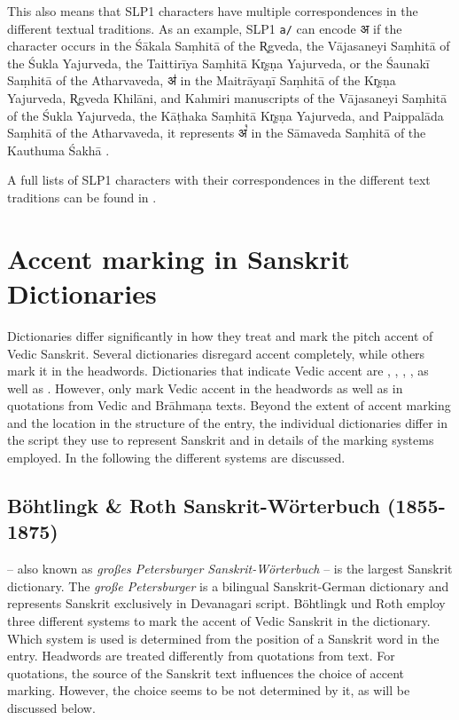 This also means that SLP1 characters have multiple correspondences in the different textual traditions. As an example, SLP1 \texttt{a/} \citep[p.~162; also SLP2 002]{ScharfHyman2011} can encode {\devfont अ} if the character occurs in the Śākala Saṃhitā of the R̥gveda, the Vājasaneyi Saṃhitā of the Śukla Yajurveda, the Taittirīya Saṃhitā Kr̥ṣṇa Yajurveda, or the Śaunakī Saṃhitā of the Atharvaveda, {\devfont अ॑} in the Maitrāyaṇī Saṃhitā of the Kr̥ṣṇa Yajurveda, R̥gveda Khilāni, and Kahmiri manuscripts of the Vājasaneyi Saṃhitā of the Śukla Yajurveda, the Kāṭhaka Saṃhitā Kr̥ṣṇa Yajurveda, and Paippalāda Saṃhitā of the Atharvaveda, it represents {\devfont अ꣡} in the Sāmaveda Saṃhitā of the Kauthuma Śakhā \citep[p.~162]{ScharfHyman2011}. 

A full lists of SLP1 characters with their correspondences in the different text traditions can be found in \citep[p.~162-203; also SLP2 002]{ScharfHyman2011}.

\chapter{Accent marking in Sanskrit Dictionaries}

Dictionaries differ significantly in how they treat and mark the pitch accent of Vedic Sanskrit. Several dictionaries disregard accent completely, while others mark it in the headwords. Dictionaries that indicate Vedic accent are \citet{pwg}, \citet{gra}, \citet{pw}, \citet{ccs,cae}, as well as \citet{mw}. However, only \citet{pwg} mark Vedic accent in the headwords as well as in quotations from Vedic and Brāhmaṇa texts. Beyond the extent of accent marking and the location in the structure of the entry, the individual dictionaries differ in the script they use to represent Sanskrit and in details of the marking systems employed. In the following the different systems are discussed.

\section{Böhtlingk \& Roth Sanskrit-Wörterbuch (1855-1875)}

\citet{pwg} – also known as \emph{großes Petersburger Sanskrit-Wörterbuch} – is the largest Sanskrit dictionary. The \emph{große Petersburger} is a bilingual Sanskrit-German dictionary and represents Sanskrit exclusively in Devanagari script. Böhtlingk und Roth employ three different systems to mark the accent of Vedic Sanskrit in the dictionary. Which system is used is determined from the position of a Sanskrit word in the entry. Headwords are treated differently from quotations from text. For quotations, the source of the Sanskrit text influences the choice of accent marking. However, the choice seems to be not determined by it, as will be discussed below.

